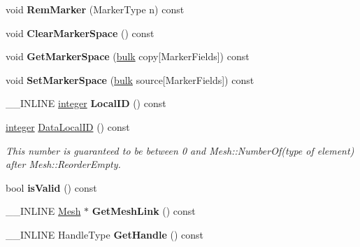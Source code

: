 \begin{DoxyCompactItemize}
\item 
\hypertarget{classINMOST_1_1Storage_a4b31f315682afcdb92e70a29d840650a}{void {\bfseries Rem\-Marker} (Marker\-Type n) const }\label{classINMOST_1_1Storage_a4b31f315682afcdb92e70a29d840650a}

\item 
\hypertarget{classINMOST_1_1Storage_a32ea32f722414ba7422366078d3e71da}{void {\bfseries Clear\-Marker\-Space} () const }\label{classINMOST_1_1Storage_a32ea32f722414ba7422366078d3e71da}

\item 
\hypertarget{classINMOST_1_1Storage_ae571daade7e16b5cb436a677ef7e2e0a}{void {\bfseries Get\-Marker\-Space} (\hyperlink{classINMOST_1_1Storage_ae429556af77094077d212e0ac23c8cfc}{bulk} copy\mbox{[}Marker\-Fields\mbox{]}) const }\label{classINMOST_1_1Storage_ae571daade7e16b5cb436a677ef7e2e0a}

\item 
\hypertarget{classINMOST_1_1Storage_a059a9c404f886d00fecd580df5534dab}{void {\bfseries Set\-Marker\-Space} (\hyperlink{classINMOST_1_1Storage_ae429556af77094077d212e0ac23c8cfc}{bulk} source\mbox{[}Marker\-Fields\mbox{]}) const }\label{classINMOST_1_1Storage_a059a9c404f886d00fecd580df5534dab}

\item 
\hypertarget{classINMOST_1_1Storage_abe3cba66241f06792ef848b07b755508}{\-\_\-\-\_\-\-I\-N\-L\-I\-N\-E \hyperlink{classINMOST_1_1Storage_aec96942bc647417a801e2895b45964d2}{integer} {\bfseries Local\-I\-D} () const }\label{classINMOST_1_1Storage_abe3cba66241f06792ef848b07b755508}

\item 
\hypertarget{classINMOST_1_1Storage_a3c453aa013219304225d6d98fe84cab4}{\hyperlink{classINMOST_1_1Storage_aec96942bc647417a801e2895b45964d2}{integer} \hyperlink{classINMOST_1_1Storage_a3c453aa013219304225d6d98fe84cab4}{Data\-Local\-I\-D} () const }\label{classINMOST_1_1Storage_a3c453aa013219304225d6d98fe84cab4}

\begin{DoxyCompactList}\small\item\em This number is guaranteed to be between 0 and Mesh\-::\-Number\-Of(type of element) after Mesh\-::\-Reorder\-Empty. \end{DoxyCompactList}\item 
\hypertarget{classINMOST_1_1Storage_a75a725fd1d76cc5b7b8098080692c8ff}{bool {\bfseries is\-Valid} () const }\label{classINMOST_1_1Storage_a75a725fd1d76cc5b7b8098080692c8ff}

\item 
\hypertarget{classINMOST_1_1Storage_a17995aa90731fae234cb2897a52ce824}{\-\_\-\-\_\-\-I\-N\-L\-I\-N\-E \hyperlink{classINMOST_1_1Mesh}{Mesh} $\ast$ {\bfseries Get\-Mesh\-Link} () const }\label{classINMOST_1_1Storage_a17995aa90731fae234cb2897a52ce824}

\item 
\hypertarget{classINMOST_1_1Storage_ac79e3f3664b2ff21892f37bce0caa0e0}{\-\_\-\-\_\-\-I\-N\-L\-I\-N\-E Handle\-Type {\bfseries Get\-Handle} () const }\label{classINMOST_1_1Storage_ac79e3f3664b2ff21892f37bce0caa0e0}

\end{DoxyCompactItemize}
